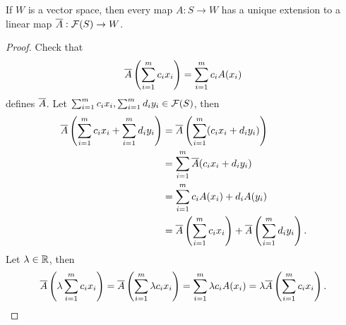 \begin{proposition}\label{12.5}
    If $W$ is a vector space, then every map $A:S \to W$ has a unique extension to a linear map
    $\overline{A}:\mathcal{F}(S) \to W$. 
\end{proposition}
\begin{proof}
    Check that 
    $$\overline{A}\left(\sum_{i=1}^{m}c_i x_i\right) = \sum_{i=1}^{m}c_i A(x_i) $$ defines $\overline{A}$. 
    Let $\sum_{i=1}^{m}c_i x_i, \sum_{i=1}^{m}d_i y_i \in \mathcal{F}(S)$, then 
    \begin{align*}
    \overline{A}\left(\sum_{i=1}^{m}c_i x_i + \sum_{i=1}^{m}d_i y_i\right) 
    &= \overline{A}\left(\sum_{i=1}^{m}(c_i x_i + d_i y_i)\right) \\
    &= \sum_{i=1}^{m} \overline{A}(c_ix_i + d_iy_i) \\
    &= \sum_{i=1}^{m} c_iA(x_i) + d_iA(y_i) \\
    &= \overline{A}\left(\sum_{i=1}^{m}c_i x_i\right) + \overline{A}\left(\sum_{i=1}^{m}d_i y_i\right).
    \end{align*}
    Let $\lambda \in \mathbb{R}$, then 
    $$\overline{A}\left(\lambda \sum_{i=1}^{m}c_i x_i\right) = \overline{A}\left(\sum_{i=1}^{m} \lambda c_i x_i\right)
    = \sum_{i=1}^{m}\lambda c_i A(x_i) = \lambda \overline{A}\left(\sum_{i=1}^{m}c_i x_i\right). $$
\end{proof}

